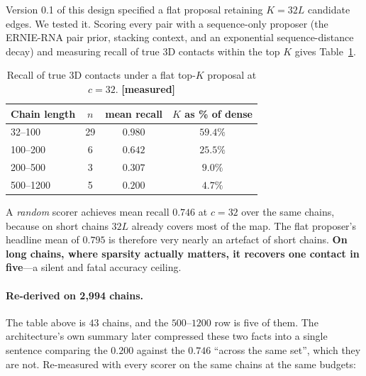 \documentclass[11pt,a4paper]{article}
\newcommand{\meas}{\textcolor{measured}{\textbf{[measured]}}}
\begin{document}
Version 0.1 of this design specified a flat proposal retaining $K = 32L$
candidate edges. We tested it. Scoring every pair with a sequence-only proposer
(the ERNIE-RNA pair prior, stacking context, and an exponential
sequence-distance decay) and measuring recall of true 3D contacts within the top
$K$ gives Table~\ref{tab:recall}.

\begin{table}[h]
\centering
\caption{Recall of true 3D contacts under a flat top-$K$ proposal at $c=32$. \meas}
\label{tab:recall}
\begin{tabular}{lccc}
\toprule
\textbf{Chain length} & \textbf{$n$} & \textbf{mean recall} & \textbf{$K$ as \% of dense} \\
\midrule
32--100   & 29 & $0.980$ & $59.4\%$ \\
100--200  & 6  & $0.642$ & $25.5\%$ \\
200--500  & 3  & $0.307$ & $9.0\%$ \\
500--1200 & 5  & $\mathbf{0.200}$ & $4.7\%$ \\
\bottomrule
\end{tabular}
\end{table}

A \emph{random} scorer achieves mean recall $0.746$ at $c=32$ over the same
chains, because on short chains $32L$ already covers most of the map. The flat
proposer's headline mean of $0.795$ is therefore very nearly an artefact of
short chains. \textcolor{risk}{\textbf{On long chains, where sparsity actually
matters, it recovers one contact in five}}---a silent and fatal accuracy
ceiling.

\paragraph{Re-derived on 2,994 chains.}
The table above is $43$ chains, and the $500$--$1200$ row is five of them. The
architecture's own summary later compressed these two facts into a single
sentence comparing the $0.200$ against the $0.746$ ``across the same set'',
which they are not. Re-measured with every scorer on the same chains at the same
budgets:
\end{document}
